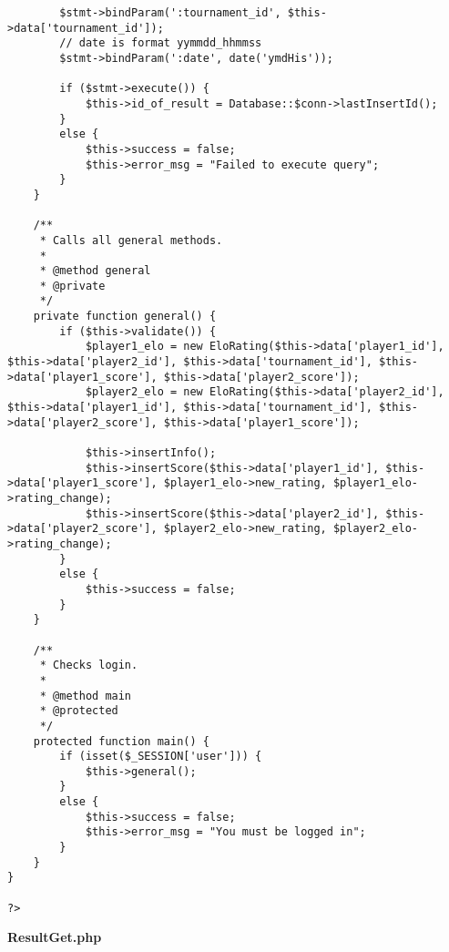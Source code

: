 {\begin{lstlisting}
		$stmt->bindParam(':tournament_id', $this->data['tournament_id']);
		// date is format yymmdd_hhmmss
		$stmt->bindParam(':date', date('ymdHis'));

		if ($stmt->execute()) {
			$this->id_of_result = Database::$conn->lastInsertId();
		}
		else {
			$this->success = false;
			$this->error_msg = "Failed to execute query";
		}
	}

	/**
	 * Calls all general methods.
	 *
	 * @method general
	 * @private
	 */
	private function general() {
		if ($this->validate()) {
			$player1_elo = new EloRating($this->data['player1_id'], $this->data['player2_id'], $this->data['tournament_id'], $this->data['player1_score'], $this->data['player2_score']);
			$player2_elo = new EloRating($this->data['player2_id'], $this->data['player1_id'], $this->data['tournament_id'], $this->data['player2_score'], $this->data['player1_score']);

			$this->insertInfo();
			$this->insertScore($this->data['player1_id'], $this->data['player1_score'], $player1_elo->new_rating, $player1_elo->rating_change);
			$this->insertScore($this->data['player2_id'], $this->data['player2_score'], $player2_elo->new_rating, $player2_elo->rating_change);
		}
		else {
			$this->success = false;
		}
	}

	/**
	 * Checks login.
	 *
	 * @method main
	 * @protected
	 */
	protected function main() {
		if (isset($_SESSION['user'])) {
			$this->general();
		}
		else {
			$this->success = false;
			$this->error_msg = "You must be logged in";
		}
	}
}

?>\end{lstlisting}
}
\textbf{ResultGet.php}

